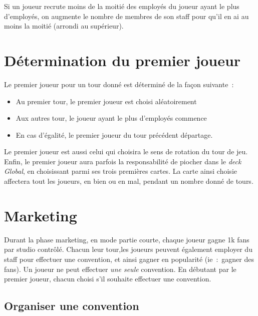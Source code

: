                 Si un joueur recrute moins de la moitié des employés du joueur ayant le plus d'employés, on augmente
                le nombre de membres de son staff pour qu'il en ai au moins la moitié (arrondi au supérieur).

        \section{Détermination du premier joueur}

            Le premier joueur pour un tour donné est déterminé de la façon suivante :
            \begin{itemize}
                \item Au premier tour, le premier joueur est choisi aléatoirement
                \item Aux autres tour, le joueur ayant le plus d'employés commence
                \item En cas d'égalité, le premier joueur du tour précédent départage.
            \end{itemize}

            Le premier joueur est aussi celui qui choisira le sens de rotation du tour de jeu.
            \newline
            Enfin, le premier joueur aura parfois la responsabilité de piocher dans le
            \emph{deck Global}, en choisissant parmi ses trois premières cartes. La
            carte ainsi choisie affectera tout les joueurs, en bien ou en mal, pendant
            un nombre donné de tours.

        \section{Marketing}

            Durant la phase marketing, en mode partie courte, chaque joueur gagne 1k fans par
            studio contrôlé.
            \newline
            Chacun leur tour,les joueurs peuvent également employer du staff pour effectuer
            une convention, et ainsi gagner en popularité (ie : gagner des fans).
            Un joueur ne peut effectuer \emph{une seule} convention.
            \newline
            En débutant par le premier joueur, chacun choisi s'il souhaite effectuer une convention.
            \subsection{Organiser une convention}

